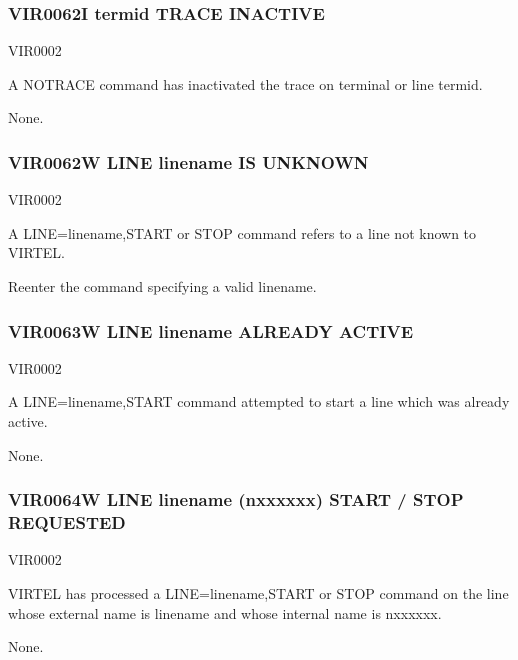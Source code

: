 \documentclass[letterpaper,10pt,english]{sphinxmanual}
\begin{document}
\subsubsection{VIR0062I termid TRACE INACTIVE}
\label{\detokenize{messages:vir0062i-termid-trace-inactive}}\begin{description}
\sphinxAtStartPar
VIR0002

\sphinxAtStartPar
A NOTRACE command has inactivated the trace on terminal or line termid.

\sphinxAtStartPar
None.

\end{description}


\subsubsection{VIR0062W LINE linename IS UNKNOWN}
\label{\detokenize{messages:vir0062w-line-linename-is-unknown}}\begin{description}
\sphinxAtStartPar
VIR0002

\sphinxAtStartPar
A LINE=linename,START or STOP command refers to a line not known to VIRTEL.

\sphinxAtStartPar
Reenter the command specifying a valid linename.

\end{description}


\subsubsection{VIR0063W LINE linename ALREADY ACTIVE}
\label{\detokenize{messages:vir0063w-line-linename-already-active}}\begin{description}
\sphinxAtStartPar
VIR0002

\sphinxAtStartPar
A LINE=linename,START command attempted to start a line which was already active.

\sphinxAtStartPar
None.

\end{description}


\subsubsection{VIR0064W LINE linename (n\sphinxhyphen{}xxxxxx) START / STOP REQUESTED}
\label{\detokenize{messages:vir0064w-line-linename-n-xxxxxx-start-stop-requested}}\begin{description}
\sphinxAtStartPar
VIR0002

\sphinxAtStartPar
VIRTEL has processed a LINE=linename,START or STOP command on the line whose external name is linename and whose internal name is n\sphinxhyphen{}xxxxxx.

\sphinxAtStartPar
None.

\end{description}
\end{document}
